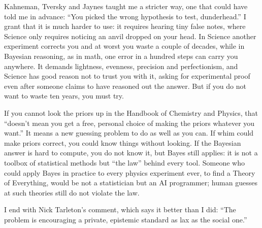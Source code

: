 Kahneman, Tversky and Jaynes taught me a stricter way, one that could have told me in advance: ``You picked the wrong hypothesis to test, dunderhead.'' I grant that it is much harder to use: it requires hearing tiny false notes, where Science only requires noticing an anvil dropped on your head. In Science another experiment corrects you and at worst you waste a couple of decades, while in Bayesian reasoning, as in math, one error in a hundred steps can carry you anywhere. It demands lightness, evenness, precision and perfectionism, and Science has good reason not to trust you with it, asking for experimental proof even after someone claims to have reasoned out the answer. But if you do not want to waste ten years, you must try.

If you cannot look the priors up in the Handbook of Chemistry and Physics, that ``doesn't mean you get a free, personal choice of making the priors whatever you want.'' It means a new guessing problem to do as well as you can. If whim could make priors correct, you could know things without looking.  If the Bayesian answer is hard to compute, you do not know it, but Bayes still applies: it is not a toolbox of statistical methods but ``the law'' behind every tool. Someone who could apply Bayes in practice to every physics experiment ever, to find a Theory of Everything, would be not a statistician but an AI programmer; human guesses at such theories still do not violate the law.

I end with Nick Tarleton's comment, which says it better than I did: ``The problem is encouraging a private, epistemic standard as lax as the social one.''
